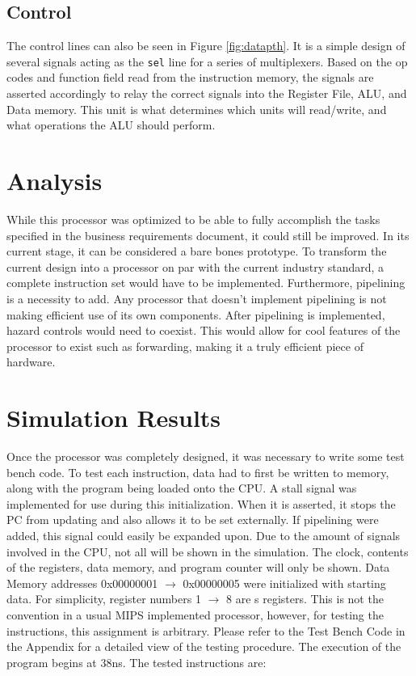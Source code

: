 \documentclass[12pt]{article}
\begin{document}
\subsection{Control}
The control lines can also be seen in Figure \ref{fig:datapth}. It is a simple design of several signals acting as the \texttt{sel} line for a series of multiplexers. Based on the op codes and function field read from the instruction memory, the signals are asserted accordingly to relay the correct signals into the Register File, ALU, and Data memory. This unit is what determines which units will read/write, and what operations the ALU should perform.
\section{Analysis}
While this processor was optimized to be able to fully accomplish the tasks specified in the business requirements document, it could still be improved. In its current stage, it can be considered a bare bones prototype. To transform the current design into a processor on par with the current industry standard, a complete instruction set would have to be implemented. Furthermore, pipelining is a necessity to add. Any processor that doesn't implement pipelining is not making efficient use of its own components. After pipelining is implemented, hazard controls would need to coexist. This would allow for cool features of the processor to exist such as forwarding, making it a truly efficient piece of hardware.
\section{Simulation Results}
Once the processor was completely designed, it was necessary to write some test bench code. To test each instruction, data had to first be written to memory, along with the program being loaded onto the CPU. A stall signal was implemented for use during this initialization. When it is asserted, it stops the PC from updating and also allows it to be set externally. If pipelining were added, this signal could easily be expanded upon. Due to the amount of signals involved in the CPU, not all will be shown in the simulation. The clock, contents of the registers, data memory, and program counter will only be shown. Data Memory addresses 0x00000001 $\to$ 0x00000005 were initialized with starting data. For simplicity, register numbers 1 $\to$ 8 are s registers. This is not the convention in a usual MIPS implemented processor, however, for testing the instructions, this assignment is arbitrary. Please refer to the Test Bench Code in the Appendix for a detailed view of the testing procedure. The execution of the program begins at 38ns. The tested instructions are:
\end{document}
